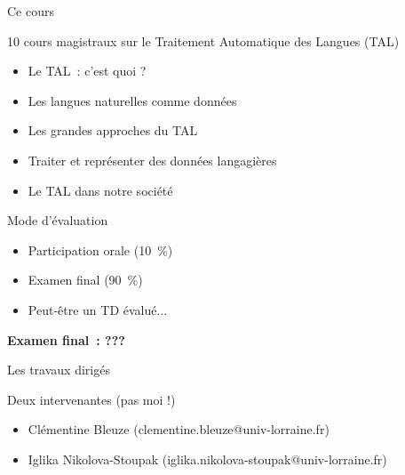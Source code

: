 \documentclass[serif, aspectratio=169]{beamer}
\begin{document}
\begin{frame}{Ce cours} %
    \begin{block}{10 cours magistraux sur le Traitement Automatique des Langues (TAL)}
        \begin{itemize}
            \item Le TAL~: c'est quoi ?
            \item Les langues naturelles comme données
            \item Les grandes approches du TAL
            \item Traiter et représenter des données langagières
            \item Le TAL dans notre société
        \end{itemize}
    \end{block}
    \begin{block}{Mode d'évaluation}
        \begin{itemize}
            \item Participation orale (10~\%) 
            \item Examen final (90~\%)
            \item Peut-être un TD évalué...
        \end{itemize}
    \end{block}
    \hfill \textbf{Examen final~: ???}
\end{frame}

\begin{frame}{Les travaux dirigés}
    \begin{block}{Deux intervenantes (pas moi !)}
        \begin{itemize}
            \item Clémentine Bleuze (clementine.bleuze@univ-lorraine.fr)
            \item Iglika Nikolova-Stoupak (iglika.nikolova-stoupak@univ-lorraine.fr)
        \end{itemize}
    \end{block}
\end{frame}
\end{document}
